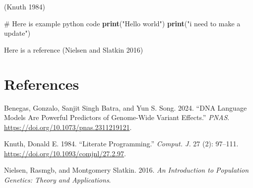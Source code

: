 \documentclass[
  a4paper,
  openany]{scrbook}
\newenvironment{Shaded}{\begin{snugshade}}{\end{snugshade}}
\newcommand{\BuiltInTok}[1]{\textcolor[rgb]{0.39,0.29,0.61}{\textbf{#1}}}
\newcommand{\CommentTok}[1]{\textcolor[rgb]{0.54,0.53,0.53}{#1}}
\newcommand{\NormalTok}[1]{\textcolor[rgb]{0.12,0.11,0.11}{#1}}
\newcommand{\StringTok}[1]{\textcolor[rgb]{0.75,0.01,0.01}{#1}}
\newlength{\cslhangindent}
\newenvironment{CSLReferences}[2] %
 {\begin{list}{}{%
  \setlength{\itemindent}{0pt}
  \setlength{\leftmargin}{0pt}
  \setlength{\parsep}{0pt}
  \ifodd #1
   \setlength{\leftmargin}{\cslhangindent}
   \setlength{\itemindent}{-1\cslhangindent}
  \fi
  \setlength{\itemsep}{#2\baselineskip}}}
 {\end{list}}
\begin{document}
(Knuth 1984)

\begin{Shaded}
\begin{Highlighting}[]
\CommentTok{\# Here is example python code}
\BuiltInTok{print}\NormalTok{(}\StringTok{"Hello world"}\NormalTok{)}
\BuiltInTok{print}\NormalTok{(}\StringTok{"i need to make a update"}\NormalTok{)}
\end{Highlighting}
\end{Shaded}

Here is a reference (Nielsen and Slatkin 2016)

\chapter{References}\label{references}

\label{refs}
\begin{CSLReferences}{1}{0}
Benegas, Gonzalo, Sanjit Singh Batra, and Yun S. Song. 2024. {``DNA
Language Models Are Powerful Predictors of Genome-Wide Variant
Effects.''} \emph{PNAS}. \url{https://doi.org/10.1073/pnas.2311219121}.

Knuth, Donald E. 1984. {``Literate Programming.''} \emph{Comput. J.} 27
(2): 97--111. \url{https://doi.org/10.1093/comjnl/27.2.97}.

Nielsen, Rasmgb, and Montgomery Slatkin. 2016. \emph{An Introduction to
Population Genetics: Theory and Applications}.

\end{CSLReferences}


\backmatter
\end{document}
